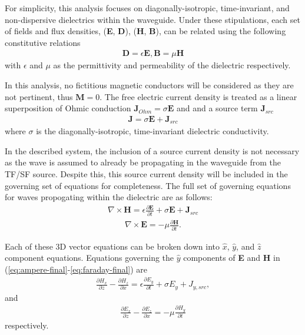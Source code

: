 For simplicity, this analysis focuses on diagonally-isotropic, time-invariant, and non-dispersive dielectrics within the waveguide. Under these stipulations, each set of fields and flux densities, (\textbf{E}, \textbf{D}), (\textbf{H}, \textbf{B}), can be related using the following constitutive relations
\begin{align}
	\textbf{D}=\epsilon\textbf{E}, \textbf{B}=\mu\textbf{H}
	\label{eq:cor}
\end{align}
with $\epsilon$ and $\mu$ as the permittivity and permeability of the dielectric respectively.

In this analysis, no fictitious magnetic conductors will be considered as they are not pertinent, thus $\textbf{M} = 0$. The free electric current density is treated as a linear superposition of Ohmic conduction $\textbf{J}_{Ohm}=\sigma\textbf{E}$ and and a source term $\textbf{J}_{src}$
\begin{align}
	\textbf{J} = \sigma\textbf{E} + \textbf{J}_{src}
	\label{eq:current}
\end{align}
where $\sigma$ is the diagonally-isotropic, time-invariant dielectric conductivity. 

In the described system, the inclusion of a source current density is not necessary as the wave is assumed to already be propagating in the waveguide from the TF/SF source. Despite this, this source current density will be included in the governing set of equations for completeness. The full set of governing equations for waves propogating within the dielectric are as follows:
\begin{align}
    \nabla\times\textbf{H} = \epsilon\frac{\partial\textbf{E}}{\partial t} + \sigma\textbf{E} + \textbf{J}_{src}
    \label{eq:ampere-final}
\end{align}
\begin{align}
    \nabla\times\textbf{E}=-\mu\frac{\partial\textbf{H}}{\partial t}.
    \label{eq:faraday-final}
\end{align}

Each of these 3D vector equations can be broken down into $\hat{x}$, $\hat{y}$, and $\hat{z}$ component equations. Equations governing the $\hat{y}$ components of \textbf{E} and \textbf{H} in  (\ref{eq:ampere-final}-\ref{eq:faraday-final}) are
\begin{align}
	\frac{\partial H_x}{\partial z} - \frac{\partial H_z}{\partial x} = \epsilon\frac{\partial E_y}{\partial t} + \sigma E_y + J_{y,src},
	\label{ampere-full-ey}
\end{align}
and
\begin{align}
	\frac{\partial E_x}{\partial z} - \frac{\partial E_z}{\partial x} =-\mu\frac{\partial H_y}{\partial t}
	\label{faraday-full-hy}
\end{align}
respectively.


